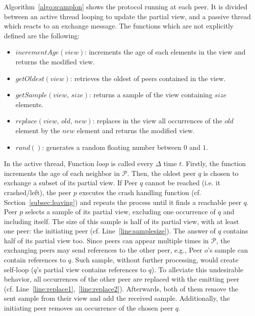 Algorithm~\ref{algo:scamplon} shows the \SCAMPLON{} protocol running at each
peer. It is divided between an active thread looping to update the partial
view, and a passive thread which reacts to an exchange message. The functions
which are not explicitly defined are the following:
\begin{itemize}
\item $incrementAge(view)$: increments the age of each elements in the view
  and returns the modified view.
\item $getOldest(view)$: retrieves the oldest of peers contained in the view.
\item $getSample(view, \, size)$: returns a sample of the view containing
  $size$ elements.
\item $replace(view,\,old,\,new)$: replaces in the view all occurrences of
  the $old$ element by the $new$ element and returns the modified view.
\item $rand()$: generates a random floating number between $0$ and $1$.
\end{itemize}
In the active thread, Function $loop$ is called every $\Delta$ time
$t$. Firstly, the function increments the age of each neighbor in
$\mathcal{P}$. Then, the oldest peer $q$ is chosen to exchange a subset of its
partial view. If Peer $q$ cannot be reached (i.e. it crashed/left), the peer
$p$ executes the crash handling function (cf. Section~\ref{subsec:leaving}) and
repeats the process until it finds a reachable peer $q$. Peer $p$ selects a
sample of its partial view, excluding one occurrence of $q$ and including
itself. The size of this sample is half of its partial view, with at least one
peer: the initiating peer (cf. Line~\ref{line:samplesize}). The answer of $q$
contains half of its partial view too. Since peers can appear multiple times in
$\mathcal{P}$, the exchanging peers may send references to the other peer,
e.g., Peer $o$'s sample can contain references to $q$. Such sample, without
further processing, would create self-loop ($q$'s partial view contains
references to $q$). To alleviate this undesirable behavior, all occurrences of
the other peer are replaced with the emitting peer
(cf. Line~\ref{line:replace1},~\ref{line:replace2}).  Afterwards, both of
them remove the sent sample from their view and add the received
sample. Additionally, the initiating peer removes an occurrence of the chosen
peer $q$.

